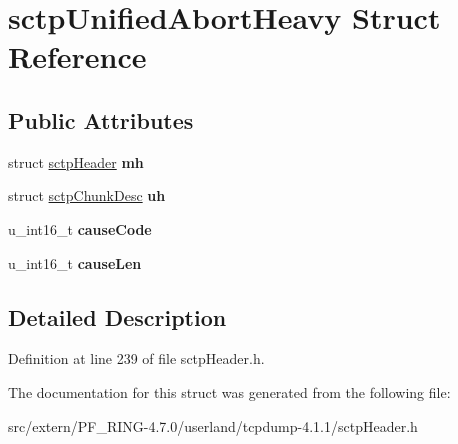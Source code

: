 \hypertarget{structsctp_unified_abort_heavy}{
\section{sctpUnifiedAbortHeavy Struct Reference}
\label{structsctp_unified_abort_heavy}
}
\subsection*{Public Attributes}
\begin{DoxyCompactItemize}
\item 
\hypertarget{structsctp_unified_abort_heavy_ab5d032811ecda07d8b00da92b07a44fb}{
struct \hyperlink{structsctp_header}{sctpHeader} {\bfseries mh}}
\label{structsctp_unified_abort_heavy_ab5d032811ecda07d8b00da92b07a44fb}

\item 
\hypertarget{structsctp_unified_abort_heavy_aaf4706e12b540e9a85a2f4755300746f}{
struct \hyperlink{structsctp_chunk_desc}{sctpChunkDesc} {\bfseries uh}}
\label{structsctp_unified_abort_heavy_aaf4706e12b540e9a85a2f4755300746f}

\item 
\hypertarget{structsctp_unified_abort_heavy_af46bd72bb7ce29c498338368f4a420dc}{
u\_\-int16\_\-t {\bfseries causeCode}}
\label{structsctp_unified_abort_heavy_af46bd72bb7ce29c498338368f4a420dc}

\item 
\hypertarget{structsctp_unified_abort_heavy_acca1721fdae2d209130849057023e793}{
u\_\-int16\_\-t {\bfseries causeLen}}
\label{structsctp_unified_abort_heavy_acca1721fdae2d209130849057023e793}

\end{DoxyCompactItemize}


\subsection{Detailed Description}


Definition at line 239 of file sctpHeader.h.



The documentation for this struct was generated from the following file:\begin{DoxyCompactItemize}
\item 
src/extern/PF\_\-RING-\/4.7.0/userland/tcpdump-\/4.1.1/sctpHeader.h\end{DoxyCompactItemize}
